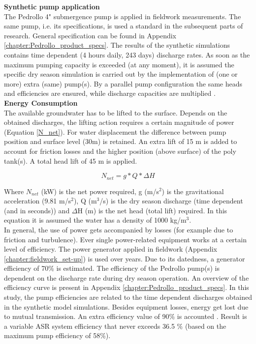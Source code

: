 \textbf{Synthetic pump application} \\
The Pedrollo 4" submergence pump is applied in fieldwork measurements. The same pump, i.e. its specifications, is used a standard in the subsequent parts of research. General specification can be found in Appendix \ref{chapter:Pedrollo_product_specs}. The results of the synthetic simulations contains time dependent (4 hours daily, 243 days) discharge rates. As soon as the maximum pumping capacity is exceeded (at any moment), it is assumed the specific dry season simulation is carried out by the implementation of (one or more) extra (same) pump(s). By a parallel pump configuration the same heads and efficiencies are ensured, while discharge capacities are multiplied \citep{VandeGiesen2013}. \\ 

\textbf{Energy Consumption} \\
The available groundwater has to be lifted to the surface. Depends on the obtained discharges, the lifting action requires a certain magnitude of power (Equation \ref{N_net}). For water displacement the difference between pump position and surface level (30m) is retained. An extra lift of 15 m is added to account for friction losses and the higher position (above surface) of the poly tank(s). A total head lift of 45 m is applied.

\begin{equation}
N_{net} =  g * Q * \Delta H
\label{N_net}
\end{equation}

Where $N_{net}$ (kW) is the net power required, g (m/s$^2$) is the gravitational acceleration (9.81 m/s$^2$), Q (m$^3$/s) is the dry season discharge (time dependent (and in seconds)) and $\Delta$H (m) is the net head (total lift) required. In this equation it is assumed the water has a density of 1000 kg/m$^3$. \\

In general, the use of power gets accompanied by losses (for example due to friction and turbulence). Ever single power-related equipment works at a certain level of efficiency. The power generator applied in fieldwork (Appendix \ref{chapter:fieldwork_set-up}) is used over years. Due to its datedness, a generator efficiency of 70\% is estimated. The efficiency of the Pedrollo pump(s) is dependent on the discharge rate during dry season operation. An overview of the efficiency curve is present in Appendix \ref{chapter:Pedrollo_product_specs}. In this study, the pump efficiencies are related to the time dependent discharges obtained in the synthetic model simulations. Besides equipment losses, energy get lost due to mutual transmission. An extra efficiency value of 90\% is accounted \citep{VandeGiesen2013}. Result is a variable ASR system efficiency that never exceeds 36.5 \% (based on the maximum pump efficiency of 58\%).

